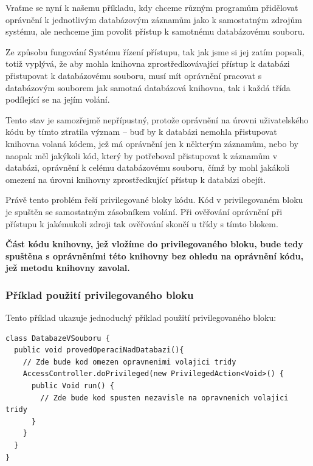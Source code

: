 Vraťme se nyní k našemu příkladu, kdy chceme různým programům přidělovat oprávnění k jednotlivým databázovým záznamům jako k samostatným zdrojům systému, ale nechceme jim povolit přístup k samotnému databázovému souboru.

Ze způsobu fungování Systému řízení přístupu, tak jak jsme si jej zatím popsali, totiž vyplývá, že aby mohla knihovna zprostředkovávající přístup k databázi přistupovat k databázovému souboru, musí mít oprávnění pracovat s databázovým souborem jak samotná databázová knihovna, tak i každá třída podílející se na jejím volání.

Tento stav je samozřejmě nepřípustný, protože oprávnění na úrovni uživatelského kódu by tímto ztratila význam -- buď by k databázi nemohla přistupovat knihovna volaná kódem, jež má oprávnění jen k některým záznamům, nebo by naopak měl jakýkoli kód, který by potřeboval přistupovat k záznamům v databázi, oprávnění k celému databázovému souboru, čímž by mohl jakákoli omezení na úrovni knihovny zprostředkující přístup k databázi obejít.

Právě tento problém řeší privilegované bloky kódu. Kód v privilegovaném bloku je spuštěn se samostatným zásobníkem volání. Při ověřování oprávnění při přístupu k jakémukoli zdroji tak ověřování skončí u třídy s tímto blokem.

{\bf Část kódu knihovny, jež vložíme do privilegovaného bloku, bude tedy spuštěna s oprávněními této knihovny bez ohledu na oprávnění kódu, jež metodu knihovny zavolal.}

\subsubsection{Příklad použití privilegovaného bloku}

Tento příklad ukazuje jednoduchý příklad použití privilegovaného bloku: \cite{refAccessController}

\begin{lstlisting}[caption=Příklad použití privilegovaného bloku, label=prikladBloku]
class DatabazeVSouboru {
  public void provedOperaciNadDatabazi(){
    // Zde bude kod omezen opravnenimi volajici tridy
    AccessController.doPrivileged(new PrivilegedAction<Void>() {
      public Void run() {
        // Zde bude kod spusten nezavisle na opravnenich volajici tridy
      }
    }
  }
}
\end{lstlisting}

